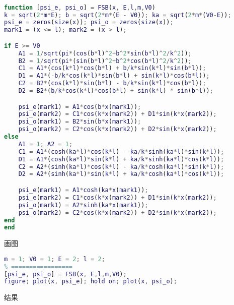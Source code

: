 
\begin{issues}
\issueDraft
\end{issues}


\begin{lstlisting}[language=matlab, caption=FSB.m]
% m 质量，V0 势垒，E 能量， L 势垒半宽;

function [psi_e, psi_o] = FSB(x, E,l,m,V0)
k = sqrt(2*m*E); b = sqrt(2*m*(E - V0)); ka = sqrt(2*m*(V0-E));
psi_e = zeros(size(x)); psi_o = zeros(size(x));
mark1 = (x <= l); mark2 = (x > l);

if E >= V0
    A1 = 1/sqrt(pi*(cos(b*l)^2+b^2*sin(b*l)^2/k^2));
    B2 = 1/sqrt(pi*(sin(b*l)^2+b^2*cos(b*l)^2/k^2));
    C1 = A1*(cos(k*l)*cos(b*l) + b/k*sin(k*l)*sin(b*l));
    D1 = A1*(-b/k*cos(k*l)*sin(b*l) + sin(k*l)*cos(b*l));
    C2 = B2*(cos(k*l)*sin(b*l) - b/k*sin(k*l)*cos(b*l));
    D2 = B2*(b/k*cos(k*l)*cos(b*l) + sin(k*l) * sin(b*l));

    psi_e(mark1) = A1*cos(b*x(mark1));
    psi_e(mark2) = C1*cos(k*x(mark2)) + D1*sin(k*x(mark2));
    psi_o(mark1) = B2*sin(b*x(mark1));
    psi_o(mark2) = C2*cos(k*x(mark2)) + D2*sin(k*x(mark2));
else
    A1 = 1; A2 = 1;
    C1 = A1*(cosh(ka*l)*cos(k*l) - ka/k*sinh(ka*l)*sin(k*l));
    D1 = A1*(cosh(ka*l)*sin(k*l) + ka/k*sinh(ka*l)*cos(k*l));
    C2 = A2*(sinh(ka*l)*cos(k*l) - ka/k*cosh(ka*l)*sin(k*l));
    D2 = A2*(sinh(ka*l)*sin(k*l) + ka/k*cosh(ka*l)*cos(k*l));

    psi_e(mark1) = A1*cosh(ka*x(mark1));
    psi_e(mark2) = C1*cos(k*x(mark2)) + D1*sin(k*x(mark2));
    psi_o(mark1) = A2*sinh(ka*x(mark1));
    psi_o(mark2) = C2*cos(k*x(mark2)) + D2*sin(k*x(mark2));
end
end
\end{lstlisting}

画图
\begin{lstlisting}[language=matlab]
% === 设置参数 =====
m = 1; V0 = 1; E = 2; l = 2;
% =================
[psi_e, psi_o] = FSB(x, E,l,m,V0);
figure; plot(x, psi_e); hold on; plot(x, psi_o);
\end{lstlisting}
结果
